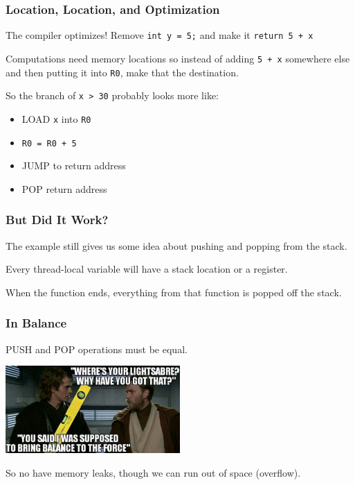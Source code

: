 \begin{frame}
\frametitle{Location, Location, and Optimization}

The compiler optimizes! Remove \texttt{int y = 5;} and make it \texttt{return 5 + x}

	
Computations need memory locations so instead of adding \texttt{5 + x} somewhere else and then putting it into \texttt{R0}, make that the destination.

So the branch of \texttt{x > 30} probably looks more like:
\begin{itemize}
	\item LOAD \texttt{x} into \texttt{R0}
	\item \texttt{R0 = R0 + 5}
	\item JUMP to return address
	\item POP return address
\end{itemize}

\end{frame}


\begin{frame}
\frametitle{But Did It Work?}

The example still gives us some idea about pushing and popping from the stack.

Every thread-local variable will have a stack location or a register.

When the function ends, everything  from that function is popped off the stack. 

\end{frame}


\begin{frame}
\frametitle{In Balance}

PUSH and POP operations must be equal. 

\begin{center}
	\includegraphics[width=0.5\textwidth]{images/balance-force.jpg}
\end{center}

So no have memory leaks, though we can run out of space (overflow).

\end{frame}


